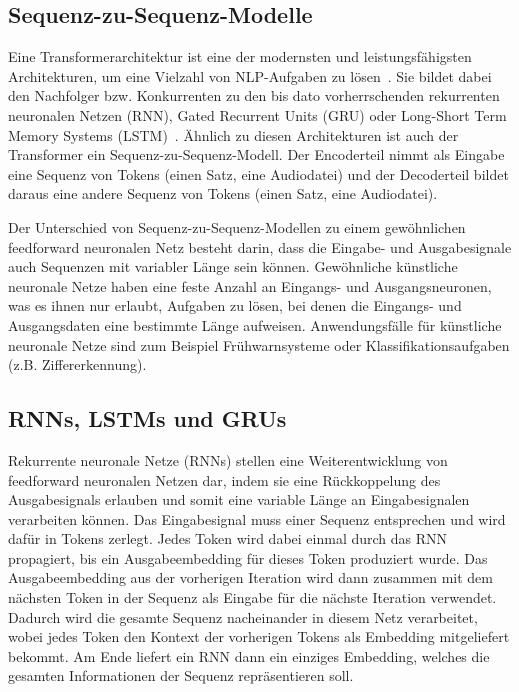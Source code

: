 \subsection{Sequenz-zu-Sequenz-Modelle}

Eine Transformerarchitektur ist eine der modernsten und leistungsfähigsten Architekturen, um eine Vielzahl von NLP-Aufgaben zu lösen~\cite{patwardhan2023}.
Sie bildet dabei den Nachfolger bzw. Konkurrenten zu den bis dato vorherrschenden rekurrenten neuronalen Netzen (RNN), Gated Recurrent Units (GRU) oder Long-Short Term Memory Systems (LSTM)~\cite{hochreiter1997}.
Ähnlich zu diesen Architekturen ist auch der Transformer ein Sequenz-zu-Sequenz-Modell.
Der Encoderteil nimmt als Eingabe eine Sequenz von Tokens (einen Satz, eine Audiodatei) und der Decoderteil bildet daraus eine andere Sequenz von Tokens (einen Satz, eine Audiodatei).

Der Unterschied von Sequenz-zu-Sequenz-Modellen zu einem gewöhnlichen feedforward neuronalen Netz besteht darin, dass die Eingabe- und Ausgabesignale auch Sequenzen mit variabler Länge sein können.
Gewöhnliche künstliche neuronale Netze haben eine feste Anzahl an Eingangs- und Ausgangsneuronen, was es ihnen nur erlaubt, Aufgaben zu lösen, bei denen die Eingangs- und Ausgangsdaten eine bestimmte Länge aufweisen.
Anwendungsfälle für künstliche neuronale Netze sind zum Beispiel Frühwarnsysteme oder Klassifikationsaufgaben (z.B. Ziffererkennung).

\subsection{RNNs, LSTMs und GRUs}

Rekurrente neuronale Netze (RNNs) stellen eine Weiterentwicklung von feedforward neuronalen Netzen dar, indem sie eine Rückkoppelung des Ausgabesignals erlauben und somit eine variable Länge an Eingabesignalen verarbeiten können.
Das Eingabesignal muss einer Sequenz entsprechen und wird dafür in Tokens zerlegt.
Jedes Token wird dabei einmal durch das RNN propagiert, bis ein Ausgabeembedding für dieses Token produziert wurde.
Das Ausgabeembedding aus der vorherigen Iteration wird dann zusammen mit dem nächsten Token in der Sequenz als Eingabe für die nächste Iteration verwendet.
Dadurch wird die gesamte Sequenz nacheinander in diesem Netz verarbeitet, wobei jedes Token den Kontext der vorherigen Tokens als Embedding mitgeliefert bekommt.
Am Ende liefert ein RNN dann ein einziges Embedding, welches die gesamten Informationen der Sequenz repräsentieren soll.


